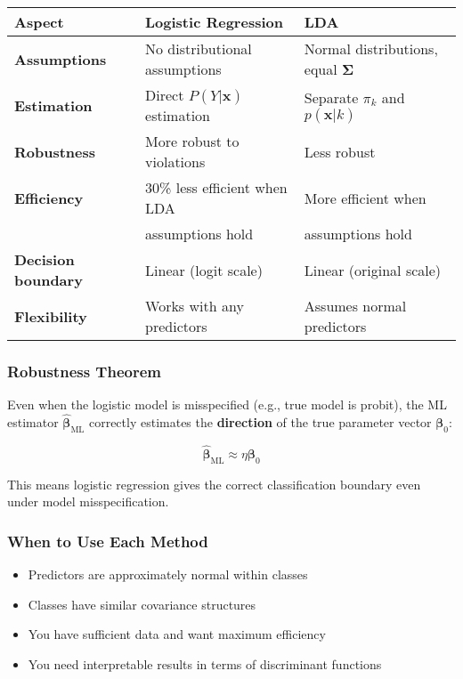 \documentclass[12pt,a4paper]{article}
\begin{document}
\begin{table}[h]
\centering
\begin{tabular}{|l|l|l|}
\hline
\textbf{Aspect} & \textbf{Logistic Regression} & \textbf{LDA} \\
\hline
\textbf{Assumptions} & No distributional assumptions & Normal distributions, equal $\boldsymbol{\Sigma}$ \\
\hline
\textbf{Estimation} & Direct $P(Y|\mathbf{x})$ estimation & Separate $\pi_k$ and $p(\mathbf{x}|k)$ \\
\hline
\textbf{Robustness} & More robust to violations & Less robust \\
\hline
\textbf{Efficiency} & 30\% less efficient when LDA & More efficient when \\
 & assumptions hold & assumptions hold \\
\hline
\textbf{Decision boundary} & Linear (logit scale) & Linear (original scale) \\
\hline
\textbf{Flexibility} & Works with any predictors & Assumes normal predictors \\
\hline
\end{tabular}
\end{table}

\subsubsection{Robustness Theorem}

\begin{tcolorbox}[colback=green!5!white,colframe=green!75!black,title=Rudd-Brillinger Theorem (1983)]
Even when the logistic model is misspecified (e.g., true model is probit), the ML estimator $\hat{\boldsymbol{\beta}}_{\text{ML}}$ correctly estimates the \textbf{direction} of the true parameter vector $\boldsymbol{\beta}_0$:

$$\hat{\boldsymbol{\beta}}_{\text{ML}} \approx \eta \boldsymbol{\beta}_0$$

This means logistic regression gives the correct classification boundary even under model misspecification.
\end{tcolorbox}

\subsubsection{When to Use Each Method}

\begin{tcolorbox}[colback=green!5!white,colframe=green!75!black,title=Use LDA when:]
\begin{itemize}
    \item Predictors are approximately normal within classes
    \item Classes have similar covariance structures
    \item You have sufficient data and want maximum efficiency
    \item You need interpretable results in terms of discriminant functions
\end{itemize}
\end{tcolorbox}
\end{document}
